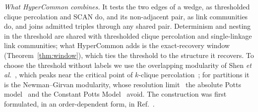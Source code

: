 \emph{What HyperCommon combines.} It tests the two edges of a wedge, as thresholded
clique percolation and SCAN do, and its non-adjacent pair, as link communities do, and
joins admitted triples through any shared pair. Determinism and nesting in the threshold
are shared with thresholded clique percolation and single-linkage link communities;
what HyperCommon adds is the exact-recovery window (Theorem~\ref{thm:window}), which
ties the threshold to the structure it recovers. To choose the threshold without labels
we use the overlapping modularity of Shen \emph{et al.}~\cite{shen2009detect}, which
peaks near the critical point of $k$-clique percolation~\cite{toth2013overlapping}; for
partitions it is the Newman--Girvan modularity, whose resolution
limit~\cite{fortunato2007resolution} the absolute Potts model~\cite{ronhovde2010local}
and the Constant Potts Model~\cite{traag2011narrow} avoid. The construction was first
formulated, in an order-dependent form, in Ref.~\cite{deinega2023thesis}.
